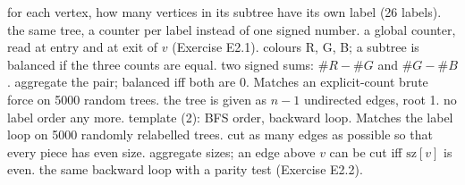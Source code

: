 \begin{variantsbox}
  {for each vertex, how many vertices in its subtree have its own label (26 labels).}
  {the same tree, a counter per label instead of one signed number.}
  {a global counter, read at entry and at exit of $v$ (Exercise E2.1).}
  {colours R, G, B; a subtree is balanced if the three counts are equal.}
  {two signed sums: $\#R - \#G$ and $\#G - \#B$.}
  {aggregate the pair; balanced iff both are 0. Matches an explicit-count brute force on 5000 random trees.}
  {the tree is given as $n - 1$ undirected edges, root 1.}
  {no label order any more.}
  {template (2): BFS order, backward loop. Matches the label loop on 5000 randomly relabelled trees.}
  {cut as many edges as possible so that every piece has even size.}
  {aggregate sizes; an edge above $v$ can be cut iff $\mathrm{sz}[v]$ is even.}
  {the same backward loop with a parity test (Exercise E2.2).}
\end{variantsbox}
